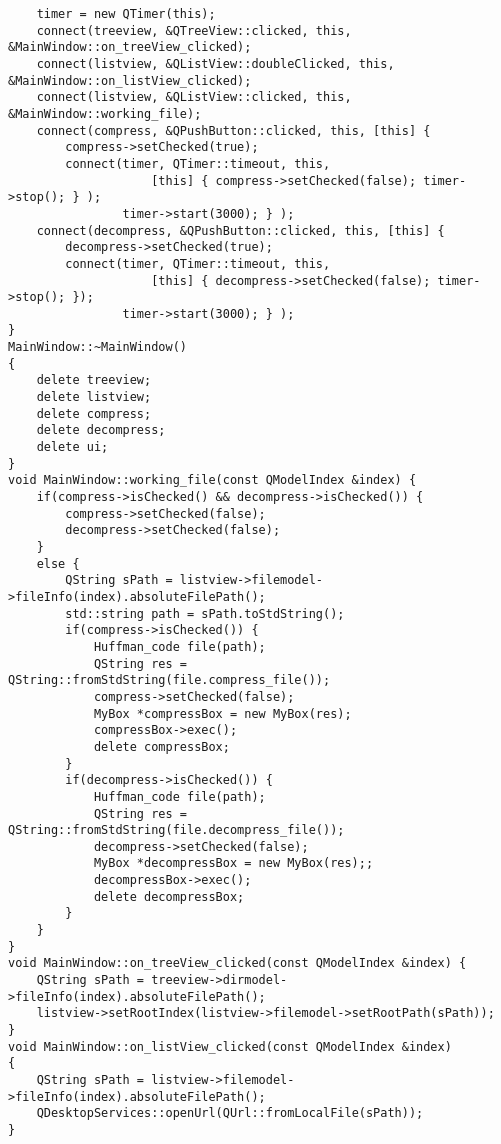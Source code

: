 \begin{verbatim}
    timer = new QTimer(this);
    connect(treeview, &QTreeView::clicked, this, &MainWindow::on_treeView_clicked);
    connect(listview, &QListView::doubleClicked, this, &MainWindow::on_listView_clicked);
    connect(listview, &QListView::clicked, this, &MainWindow::working_file);
    connect(compress, &QPushButton::clicked, this, [this] {
        compress->setChecked(true);
        connect(timer, QTimer::timeout, this,
                    [this] { compress->setChecked(false); timer->stop(); } );
                timer->start(3000); } );
    connect(decompress, &QPushButton::clicked, this, [this] {
        decompress->setChecked(true);
        connect(timer, QTimer::timeout, this,
                    [this] { decompress->setChecked(false); timer->stop(); });
                timer->start(3000); } );
}
MainWindow::~MainWindow()
{
    delete treeview;
    delete listview;
    delete compress;
    delete decompress;
    delete ui;
}
void MainWindow::working_file(const QModelIndex &index) {
    if(compress->isChecked() && decompress->isChecked()) {
        compress->setChecked(false);
        decompress->setChecked(false);
    }
    else {
        QString sPath = listview->filemodel->fileInfo(index).absoluteFilePath();
        std::string path = sPath.toStdString();
        if(compress->isChecked()) {
            Huffman_code file(path);
            QString res = QString::fromStdString(file.compress_file());
            compress->setChecked(false);
            MyBox *compressBox = new MyBox(res);
            compressBox->exec();
            delete compressBox;
        }
        if(decompress->isChecked()) {
            Huffman_code file(path);
            QString res = QString::fromStdString(file.decompress_file());
            decompress->setChecked(false);
            MyBox *decompressBox = new MyBox(res);;
            decompressBox->exec();
            delete decompressBox;
        }
    }
}
void MainWindow::on_treeView_clicked(const QModelIndex &index) {
    QString sPath = treeview->dirmodel->fileInfo(index).absoluteFilePath();
    listview->setRootIndex(listview->filemodel->setRootPath(sPath));
}
void MainWindow::on_listView_clicked(const QModelIndex &index)
{
    QString sPath = listview->filemodel->fileInfo(index).absoluteFilePath();
    QDesktopServices::openUrl(QUrl::fromLocalFile(sPath));
}
\end{verbatim}

